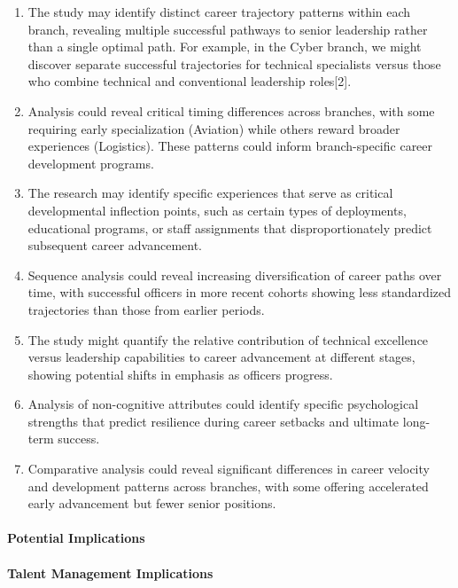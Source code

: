 \documentclass[./main.tex]{subfiles}
\begin{document}
\begin{enumerate}
\def\labelenumi{\arabic{enumi}.}
\item
  The study may identify distinct career trajectory patterns within each
  branch, revealing multiple successful pathways to senior leadership
  rather than a single optimal path. For example, in the Cyber branch,
  we might discover separate successful trajectories for technical
  specialists versus those who combine technical and conventional
  leadership roles{[}2{]}.
\item
  Analysis could reveal critical timing differences across branches,
  with some requiring early specialization (Aviation) while others
  reward broader experiences (Logistics). These patterns could inform
  branch-specific career development programs.
\item
  The research may identify specific experiences that serve as critical
  developmental inflection points, such as certain types of deployments,
  educational programs, or staff assignments that disproportionately
  predict subsequent career advancement.
\item
  Sequence analysis could reveal increasing diversification of career
  paths over time, with successful officers in more recent cohorts
  showing less standardized trajectories than those from earlier
  periods.
\item
  The study might quantify the relative contribution of technical
  excellence versus leadership capabilities to career advancement at
  different stages, showing potential shifts in emphasis as officers
  progress.
\item
  Analysis of non-cognitive attributes could identify specific
  psychological strengths that predict resilience during career setbacks
  and ultimate long-term success.
\item
  Comparative analysis could reveal significant differences in career
  velocity and development patterns across branches, with some offering
  accelerated early advancement but fewer senior positions.
\end{enumerate}

\paragraph{Potential Implications}\label{potential-implications}

\paragraph{Talent Management
Implications}\label{talent-management-implications}
\end{document}
